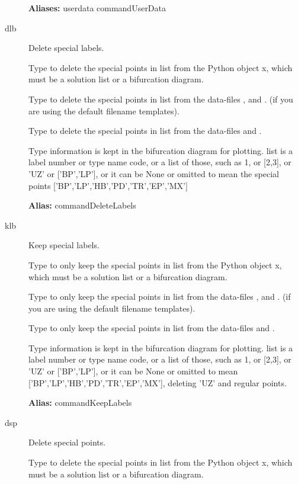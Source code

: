\documentclass[12pt]{report}
\begin{document}
\begin{description}
\textbf{Aliases:} userdata commandUserData

\item[dlb]
Delete special labels.

    Type  to delete the special points in list from
    the Python object x, which must be a solution list or a bifurcation diagram.

    Type  to delete the special points in list from
    the data-files , and .
    (if you are using the default filename templates).

    Type  to delete the special points in list from
    the data-files  and .

    Type information is kept in the bifurcation diagram for plotting.
    list is a label number or type name code, or a list of those,
    such as 1, or [2,3], or 'UZ' or ['BP','LP'], or it can be None or
    omitted to mean the special points ['BP','LP','HB','PD','TR','EP','MX']

\textbf{Alias:} commandDeleteLabels

\item[klb]
Keep special labels.

    Type  to only keep the special points in list from
    the Python object x, which must be a solution list or a bifurcation diagram.

    Type  to only keep the special points in list from
    the data-files , and .
    (if you are using the default filename templates).

    Type  to only keep the special points in list from
    the data-files  and .

    Type information is kept in the bifurcation diagram for plotting.
    list is a label number or type name code, or a list of those,
    such as 1, or [2,3], or 'UZ' or ['BP','LP'], or it can be None or
    omitted to mean ['BP','LP','HB','PD','TR','EP','MX'], deleting 'UZ' and
    regular points.

\textbf{Alias:} commandKeepLabels

\item[dsp]
Delete special points.

    Type  to delete the special points in list from
    the Python object x, which must be a solution list or a bifurcation diagram.


\end{description}
\end{document}
